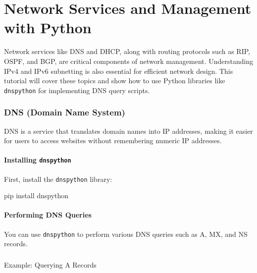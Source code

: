 \documentclass[
  letterpaper,
  DIV=11,
  numbers=noendperiod]{scrreprt}
\makeatletter
\let\oldparagraph\paragraph
\renewcommand{\paragraph}{
    \@ifstar
      \xxxParagraphStar
      \xxxParagraphNoStar
  }
\newcommand{\xxxParagraphStar}[1]{\oldparagraph*{#1}\mbox{}}
\newcommand{\xxxParagraphNoStar}[1]{\oldparagraph{#1}\mbox{}}
\newenvironment{Shaded}{\begin{snugshade}}{\end{snugshade}}
\newcommand{\ExtensionTok}[1]{\textcolor[rgb]{0.00,0.23,0.31}{#1}}
\newcommand{\NormalTok}[1]{\textcolor[rgb]{0.00,0.23,0.31}{#1}}
\makeatother
\begin{document}

\chapter{Network Services and Management with
Python}\label{network-services-and-management-with-python}

Network services like DNS and DHCP, along with routing protocols such as
RIP, OSPF, and BGP, are critical components of network management.
Understanding IPv4 and IPv6 subnetting is also essential for efficient
network design. This tutorial will cover these topics and show how to
use Python libraries like \texttt{dnspython} for implementing DNS query
scripts.

\subsection{DNS (Domain Name System)}\label{dns-domain-name-system}

DNS is a service that translates domain names into IP addresses, making
it easier for users to access websites without remembering numeric IP
addresses.

\subsubsection{\texorpdfstring{Installing
\texttt{dnspython}}{Installing dnspython}}\label{installing-dnspython}

First, install the \texttt{dnspython} library:

\begin{Shaded}
\begin{Highlighting}[]
\ExtensionTok{pip}\NormalTok{ install dnspython}
\end{Highlighting}
\end{Shaded}

\subsubsection{Performing DNS Queries}\label{performing-dns-queries}

You can use \texttt{dnspython} to perform various DNS queries such as A,
MX, and NS records.

\paragraph{Example: Querying A
Records}\label{example-querying-a-records}
\end{document}
